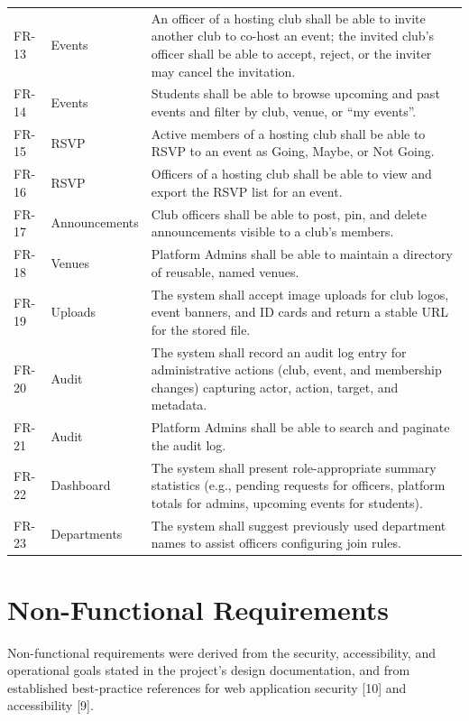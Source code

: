 \documentclass[12pt,oneside]{book}
\begin{document}
\begin{longtable}{@{}p{1.3cm}p{2.6cm}p{10.3cm}@{}}
FR-13 & Events & An officer of a hosting club shall be able to invite another club to co-host an event; the invited club's officer shall be able to accept, reject, or the inviter may cancel the invitation. \\
FR-14 & Events & Students shall be able to browse upcoming and past events and filter by club, venue, or ``my events''. \\
FR-15 & RSVP & Active members of a hosting club shall be able to RSVP to an event as Going, Maybe, or Not Going. \\
FR-16 & RSVP & Officers of a hosting club shall be able to view and export the RSVP list for an event. \\
FR-17 & Announcements & Club officers shall be able to post, pin, and delete announcements visible to a club's members. \\
FR-18 & Venues & Platform Admins shall be able to maintain a directory of reusable, named venues. \\
FR-19 & Uploads & The system shall accept image uploads for club logos, event banners, and ID cards and return a stable URL for the stored file. \\
FR-20 & Audit & The system shall record an audit log entry for administrative actions (club, event, and membership changes) capturing actor, action, target, and metadata. \\
FR-21 & Audit & Platform Admins shall be able to search and paginate the audit log. \\
FR-22 & Dashboard & The system shall present role-appropriate summary statistics (e.g., pending requests for officers, platform totals for admins, upcoming events for students). \\
FR-23 & Departments & The system shall suggest previously used department names to assist officers configuring join rules. \\
\end{longtable}

\section{Non-Functional Requirements}

Non-functional requirements were derived from the security, accessibility, and operational goals stated in the project's design documentation, and from established best-practice references for web application security [10] and accessibility [9].
\end{document}
